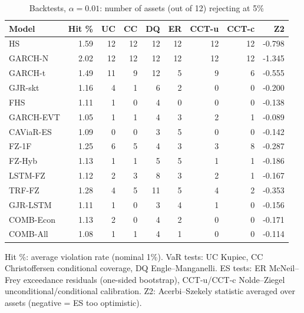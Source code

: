 \begin{table}[htbp]
\centering
\footnotesize
\caption{Backtests, $\alpha=0.01$: number of assets (out of 12) rejecting at 5\%}
\label{tab:bt_a010}
\begin{tabular}{lrrrrrrrr}
\toprule
Model & Hit \% & UC & CC & DQ & ER & CCT-u & CCT-c & Z2 \\
\midrule
HS & 1.59 & 12 & 12 & 12 & 12 & 12 & 12 & -0.798 \\
GARCH-N & 2.02 & 12 & 12 & 12 & 12 & 12 & 12 & -1.345 \\
GARCH-t & 1.49 & 11 & 9 & 12 & 5 & 9 & 6 & -0.555 \\
GJR-skt & 1.16 & 4 & 1 & 6 & 2 & 0 & 0 & -0.200 \\
FHS & 1.11 & 1 & 0 & 4 & 0 & 0 & 0 & -0.138 \\
GARCH-EVT & 1.05 & 1 & 1 & 4 & 3 & 2 & 1 & -0.089 \\
CAViaR-ES & 1.09 & 0 & 0 & 3 & 5 & 0 & 0 & -0.142 \\
FZ-1F & 1.25 & 6 & 5 & 4 & 3 & 3 & 8 & -0.287 \\
FZ-Hyb & 1.13 & 1 & 1 & 5 & 5 & 1 & 1 & -0.186 \\
LSTM-FZ & 1.12 & 2 & 3 & 8 & 3 & 2 & 1 & -0.167 \\
TRF-FZ & 1.28 & 4 & 5 & 11 & 5 & 4 & 2 & -0.353 \\
GJR-LSTM & 1.11 & 1 & 0 & 3 & 4 & 1 & 0 & -0.156 \\
COMB-Econ & 1.13 & 2 & 0 & 4 & 2 & 0 & 0 & -0.171 \\
COMB-All & 1.08 & 1 & 1 & 4 & 1 & 0 & 0 & -0.114 \\
\bottomrule
\end{tabular}
\par\smallskip\parbox{\linewidth}{\scriptsize Hit \%: average violation rate (nominal 1\%). VaR tests: UC Kupiec, CC Christoffersen conditional coverage, DQ Engle--Manganelli. ES tests: ER McNeil--Frey exceedance residuals (one-sided bootstrap), CCT-u/CCT-c Nolde--Ziegel unconditional/conditional calibration. Z2: Acerbi--Szekely statistic averaged over assets (negative = ES too optimistic).}
\end{table}